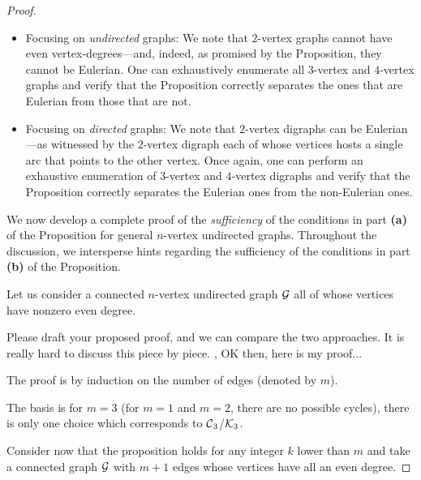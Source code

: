 \begin{proof}
\begin{itemize}
\item
Focusing on {\em undirected} graphs: We note that $2$-vertex graphs
cannot have even vertex-degrees---and, indeed, as promised by the
Proposition, they cannot be Eulerian.  One can exhaustively enumerate
all $3$-vertex and $4$-vertex graphs and verify that the Proposition correctly
separates the ones that are Eulerian from those that are not.
\item
Focusing on {\em directed} graphs: We note that $2$-vertex digraphs can be
Eulerian---as witnessed by the $2$-vertex digraph each of whose vertices
hosts a single arc that points to the other vertex.  Once again, one can
perform an exhaustive enumeration of $3$-vertex and $4$-vertex digraphs
and verify that the Proposition correctly separates the Eulerian ones
from the non-Eulerian ones.
\end{itemize}

We now develop a complete proof of the {\em sufficiency} of the
conditions in part {\bf (a)} of the Proposition for general $n$-vertex
undirected graphs.  Throughout the discussion, we intersperse hints
regarding the sufficiency of the conditions in part {\bf (b)} of the Proposition.

Let us consider a connected $n$-vertex undirected graph $\mbox{$\cal G$}$ all of
whose vertices have nonzero even degree.

{\Arny Please draft your proposed proof, and we can compare the two approaches.  It is
really hard to discuss this piece by piece.}
{\Denis, OK then, here is my proof...}

The proof is by induction on the number of edges (denoted by $m$).

The basis is for $m=3$ (for $m=1$ and $m=2$, there are no possible cycles),
there is only one choice which corresponds to $\mbox{$\cal C$}_3$/$\mbox{$\cal K$}_3$.

Consider now that the proposition holds for any integer $k$ lower than $m$ and
take a connected graph $\mbox{$\cal G$}$ with $m+1$ edges whose vertices have all an even degree.


\end{proof}
